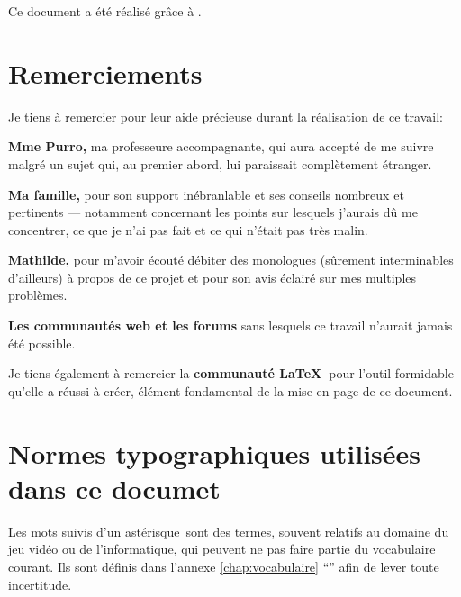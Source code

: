 \clearpage
\null
\vfill
\begin{center}
	Ce document a été réalisé grâce à \XeLaTeX.
\end{center}
\newpage




\null
\vspace{.1\textheight}
\section*{Remerciements}
Je tiens à remercier pour leur aide précieuse durant la réalisation de ce travail:

\textbf{Mme Purro, }ma professeure accompagnante, qui aura accepté de me suivre malgré un sujet qui, au premier abord, lui paraissait complètement étranger.

\textbf{Ma famille, }pour son support inébranlable et ses conseils nombreux et pertinents --- notamment concernant les points sur lesquels j'aurais dû me concentrer, ce que je n'ai pas fait et ce qui n'était pas très malin.

\textbf{Mathilde, }pour m'avoir écouté débiter des monologues (sûrement interminables d'ailleurs) à propos de ce projet et pour son avis éclairé sur mes multiples problèmes.

\textbf{Les communautés web et les forums} sans lesquels ce travail n'aurait jamais été possible.

\vspace*{.5cm}
Je tiens également à remercier la \textbf{communauté \LaTeX\ }pour l'outil formidable qu'elle a réussi à créer, élément fondamental de la mise en page de ce document.

\newpage
\null
\vspace{.1\textheight}
\section*{Normes typographiques utilisées dans ce documet}
Les mots suivis d'un astérisque\ sont des termes, souvent relatifs au domaine du jeu vidéo ou de l'informatique, qui peuvent ne pas faire partie du vocabulaire courant. Ils sont définis dans l'annexe \ref{chap:vocabulaire} \enquote{} afin de lever toute incertitude.


\vspace*{-\baselineskip}

\vspace*{-\baselineskip}


\null
\vfill







